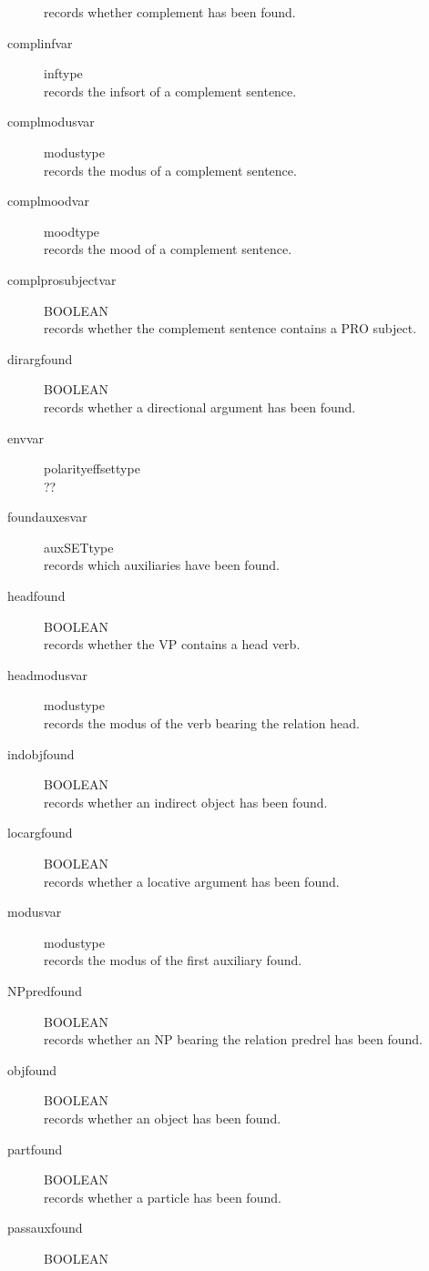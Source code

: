 \begin{description}
records whether complement has been found.
\item [complinfvar        ] inftype\\
records the infsort of a complement sentence.
\item [complmodusvar      ] modustype\\
records the modus of a complement sentence.
\item [complmoodvar       ] moodtype\\
records the mood of a complement sentence.
\item [complprosubjectvar ] BOOLEAN\\
records whether the complement sentence contains a PRO subject.
\item [dirargfound        ] BOOLEAN\\
records whether a directional argument has been found.
\item [envvar             ] polarityeffsettype\\
??
\item [foundauxesvar      ] auxSETtype\\
records which auxiliaries have been found.
\item [headfound          ] BOOLEAN\\
records whether the VP contains a head verb.
\item [headmodusvar       ] modustype\\
records the modus of the verb bearing the relation head.
\item [indobjfound        ] BOOLEAN\\
records whether an indirect object has been found.
\item [locargfound        ] BOOLEAN\\
records whether a locative argument has been found.
\item [modusvar           ] modustype\\
records the modus of the first auxiliary found.
\item [NPpredfound        ] BOOLEAN\\
records whether an NP bearing the relation predrel has been found.
\item [objfound           ] BOOLEAN\\
records whether an object has been found.
\item [partfound          ] BOOLEAN\\
records whether a particle has been found.
\item [passauxfound       ] BOOLEAN\\

\end{description}
